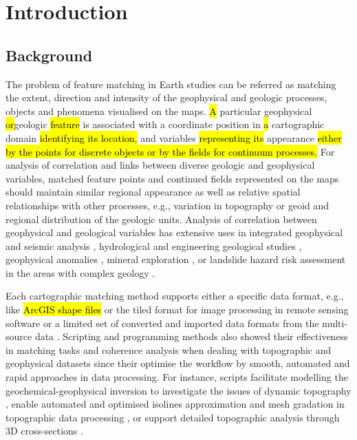 \documentclass[minerals,article,submit,pdftex,moreauthors]{Definitions/mdpi}
\begin{document}
\section{Introduction}

\subsection{Background}

The problem of feature matching in Earth studies can be referred as matching the extent, direction and intensity of the geophysical and geologic processes, objects and phenomena visualised on the maps. \hl{A} particular\hl{ }geophysical\hl{ or}geologic \hl{feature} is associated with a coordinate position in \hl{a} cartographic domain\hl{ identifying its location, }and \hl{ }variables \hl{representing its} appearance\hl{ either by the points for discrete objects or by the fields for continuum processes. }For analysis of correlation and links between diverse geologic and geophysical variables, matched feature points and continued fields represented on the maps should maintain  similar regional appearance as well as relative spatial relationships with other processes, e.g., variation in topography or geoid and regional distribution of the geologic units. Analysis of correlation between geophysical and geological variables has extensive uses in integrated geophysical and seismic analysis \cite{NDAMNJIKAM2023104816}, hydrological and engineering geological studies \cite{AMPONSAH2022104558,info14040249,jmse11040871}, geophysical anomalies \cite{MATENDE2023104766}, mineral exploration \cite{STEUER2020104172}, or landslide hazard risk assessment in the areas with complex geology \cite{CALAMITA2023106984,DIMAIO2020105473}.

Each cartographic matching method supports either a specific data format, e.g., like \hl{ArcGIS shape files} \cite{LAR2023e01436,NGENE2022360,CHENG2022106052} or the tiled format for image processing in remote sensing software \cite{KONWEA2023e01597,ALKHERSAN2022104678} or a limited set of converted and imported data formats from the multi-source data \cite{SAHA2022104706,APEH2022104561,SHEBL2022765}. Scripting and programming methods also showed their effectiveness in matching tasks and coherence analysis when dealing with topographic and geophysical datasets since their optimise the workflow by smooth, automated and rapid approaches in data processing. For instance, scripts facilitate modelling the geochemical-geophysical inversion to investigate the issues of dynamic topography \cite{Jones}, enable automated and optimised isolines approximation and mesh gradation in topographic data processing \cite{GORMAN20081721}, or support detailed topographic analysis through 3D cross-sections \cite{Sobh,Lemenkova202301}.
\end{document}
